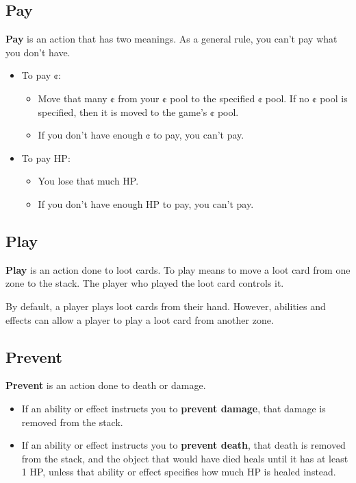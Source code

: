 \documentclass[10pt, a4paper, twoside]{article} %
\begin{document}
    \subsection{Pay}
    \textbf{Pay} is an action that has two meanings. As a general rule, you can’t pay what you don’t have.
    \begin{itemize}
        \item To pay ¢:
        \begin{itemize}
            \item Move that many ¢ from your ¢ pool to the specified ¢ pool. If no ¢ pool is specified, then it is moved to the game’s ¢ pool.
            \item If you don’t have enough ¢ to pay, you can’t pay.
        \end{itemize}
        \item To pay HP: 
        \begin{itemize}
            \item You lose that much HP.
            \item If you don’t have enough HP to pay, you can’t pay.
        \end{itemize}
    \end{itemize}
    \subsection{Play}
    \textbf{Play} is an action done to loot cards. To play means to move a loot card from one zone to the stack. The player who played the loot card controls it.

    By default, a player plays loot cards from their hand. However, abilities and effects can allow a player to play a loot card from another zone.
    \subsection{Prevent}
    \textbf{Prevent} is an action done to death or damage.

    \begin{itemize}
        \item If an ability or effect instructs you to \textbf{prevent damage}, that damage is removed from the stack.
        \item If an ability or effect instructs you to \textbf{prevent death}, that death is removed from the stack, and the object that would have died heals until it has at least 1 HP, unless that ability or effect specifies how much HP is healed instead.
    \end{itemize}
\end{document}
